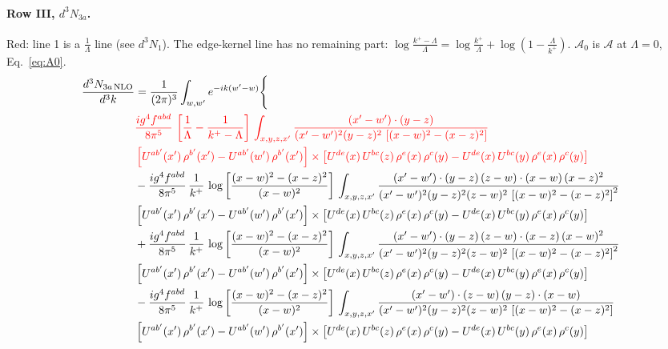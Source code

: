\documentclass[10pt]{article}
\numberwithin{equation}{section}
\newcommand{\old}[1]{{\color{red}#1}}
\newcommand{\rc}{\color{red}}
\begin{document}
\paragraph{Row III, $d^3N_{3a}$.}
\old{Red}: line 1 is a $\frac{1}{\Lambda}$ line (see $d^3N_1$). The edge-kernel line has no remaining part: $\log\frac{k^+-\Lambda}{\Lambda}=\log\frac{k^+}{\Lambda}+\log(1-\frac{\Lambda}{k^+})$. $\mathcal A_0$ is $\mathcal A$ at $\Lambda=0$, Eq.~\eqref{eq:A0}.
\begin{align}
\frac{d^{3}N_{3a\,\rm NLO}}{d^{3}k} & = \frac{1}{(2\pi)^{3}}\int_{w,w'}e^{-ik(w'-w)}\Bigg\{\notag \\
& \rc  \frac{ig^{4}f^{abd}}{8\pi^{5}}\,\left[\frac{1}{\Lambda}-\frac{1}{k^{+}-\Lambda}\right]\,\int_{x,y,z,x'}
\frac{(x'-w')\cdot(y-z)}{(x'-w')^{2}(y-z)^{2}\,\left[(x-w)^{2}-(x-z)^{2}\right]}\notag \\ & \rc  \left[U^{ab'}(x')\,\rho^{b'}(x')-U^{ab'}(w')\, \rho^{b'}(x')\right]\times \left[U^{de}(x)\,U^{bc}(z)\, \rho^{e}(x)\,\rho^{c}(y)-U^{de}(x)\,U^{bc}(y)\,\rho^{e}(x)\,\rho^{c}(y)\right] \notag \\
& 
-\frac{ig^{4}f^{abd}}{8\pi^{5}}\,\frac{1}{k^{+}}\,\log{\left[\frac{(x-w)^{2}-(x-z)^{2}}{(x-w)^{2}}\right]}\,\int_{x,y,z,x'}
\frac{(x'-w')\cdot(y-z)\,(z-w)\cdot(x-w)\,(x-z)^{2}}{(x'-w')^{2}(y-z)^{2}(z-w)^{2}\,\left[(x-w)^{2}-(x-z)^{2}\right]^{2}}\notag \\ & \left[U^{ab'}(x')\,\rho^{b'}(x')-U^{ab'}(w')\, \rho^{b'}(x')\right]\times \left[U^{de}(x)\,U^{bc}(z)\, \rho^{e}(x)\,\rho^{c}(y)-U^{de}(x)\,U^{bc}(y)\,\rho^{e}(x)\,\rho^{c}(y)\right] \notag \\
& +\frac{ig^{4}f^{abd}}{8\pi^{5}}\,\frac{1}{k^{+}}\,\log{\left[\frac{(x-w)^{2}-(x-z)^{2}}{(x-w)^{2}}\right]}\,\int_{x,y,z,x'}
\frac{(x'-w')\cdot(y-z)\,(z-w)\cdot(x-z)\,(x-w)^{2}}{(x'-w')^{2}(y-z)^{2}(z-w)^{2}\,\left[(x-w)^{2}-(x-z)^{2}\right]^{2}}\notag \\ 
&\left[U^{ab'}(x')\,\rho^{b'}(x')-U^{ab'}(w')\, \rho^{b'}(x')\right]\times \left[U^{de}(x)\,U^{bc}(z)\, \rho^{e}(x)\,\rho^{c}(y)-U^{de}(x)\,U^{bc}(y)\,\rho^{e}(x)\,\rho^{c}(y)\right] \notag \\
& -\frac{ig^{4}f^{abd}}{8\pi^{5}}\,\frac{1}{k^{+}}\,\log{\left[\frac{(x-w)^{2}-(x-z)^{2}}{(x-w)^{2}}\right]}\,\int_{x,y,z,x'}
\frac{(x'-w')\cdot(z-w)\,(y-z)\cdot(x-w)}{(x'-w')^{2}(y-z)^{2}(z-w)^{2}\,\left[(x-w)^{2}-(x-z)^{2}\right]}\notag \\ & \left[U^{ab'}(x')\,\rho^{b'}(x')-U^{ab'}(w')\, \rho^{b'}(x')\right]\times \left[U^{de}(x)\,U^{bc}(z)\, \rho^{e}(x)\,\rho^{c}(y)-U^{de}(x)\,U^{bc}(y)\,\rho^{e}(x)\,\rho^{c}(y)\right] \notag \\

\end{align}
\end{document}
